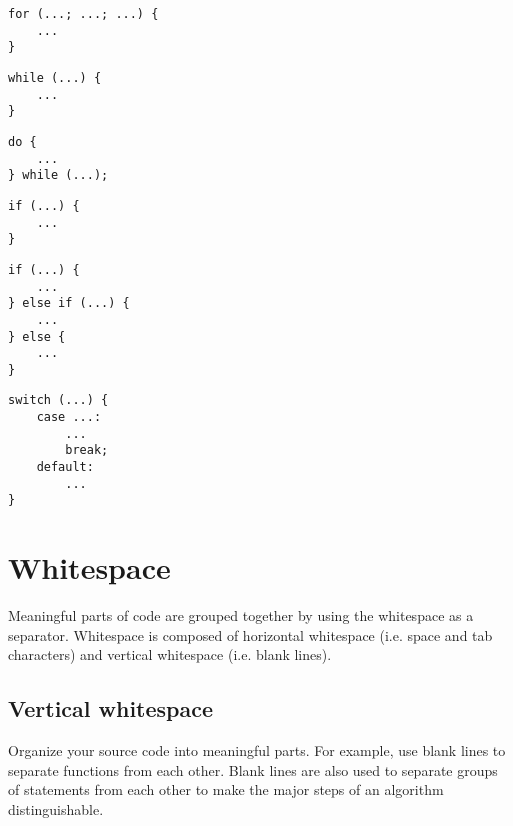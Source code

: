 \documentclass{article}
\begin{document}
\begin{multicols}{2}
\begin{lstlisting}
for (...; ...; ...) {
    ...
}
\end{lstlisting}

\begin{lstlisting}
while (...) {
    ...
}
\end{lstlisting}

\begin{lstlisting}
do {
    ...
} while (...);
\end{lstlisting}

\begin{lstlisting}
if (...) {
    ...
}
\end{lstlisting}
\vfill
\columnbreak

\begin{lstlisting}
if (...) {
    ...
} else if (...) {
    ...
} else {
    ...
}
\end{lstlisting}

\begin{lstlisting}
switch (...) {
    case ...:
        ...
        break;
    default:
        ...
}
\end{lstlisting}
\end{multicols}

\clearpage
\section{Whitespace}
Meaningful parts of code are grouped together by using the whitespace as a separator.
Whitespace is composed of horizontal whitespace (i.e. space and tab characters) and vertical whitespace (i.e. blank lines).

\subsection{Vertical whitespace}
Organize your source code into meaningful parts.
For example, use blank lines to separate functions from each other.
Blank lines are also used to separate groups of statements from each other to make the major steps of an algorithm distinguishable.
\end{document}
